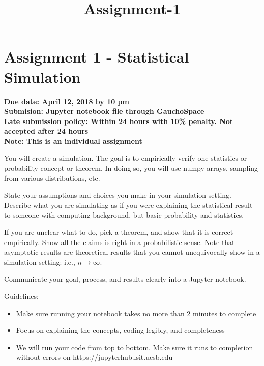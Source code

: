 \documentclass[11pt]{article}
\title{Assignment-1}
\providecommand{\tightlist}{%
      \setlength{\itemsep}{0pt}\setlength{\parskip}{0pt}}
\begin{document}
    
    
    \maketitle
    
    

    
    \hypertarget{assignment-1---statistical-simulation}{%
\section{Assignment 1 - Statistical
Simulation}\label{assignment-1---statistical-simulation}}

\textbf{Due date: April 12, 2018 by 10 pm}\\
\textbf{Submision: Jupyter notebook file through GauchoSpace}\\
\textbf{Late submission policy: Within 24 hours with 10\% penalty. Not
accepted after 24 hours}\\
\textbf{Note: This is an individual assignment}

You will create a simulation. The goal is to empirically verify one
statistics or probability concept or theorem. In doing so, you will use
numpy arrays, sampling from various distributions, etc.

State your assumptions and choices you make in your simulation setting.
Describe what you are simulating as if you were explaining the
statistical result to someone with computing background, but basic
probability and statistics.

If you are unclear what to do, pick a theorem, and show that it is
correct empirically. Show all the claims is right in a probabilistic
sense. Note that asymptotic results are theoretical results that you
cannot unequivocally show in a simulation setting: i.e.,
\(n\rightarrow\infty\).

Communicate your goal, process, and results clearly into a Jupyter
notebook.

Guidelines:

\begin{itemize}
\tightlist
\item
  Make sure running your notebook takes no more than 2 minutes to
  complete
\item
  Focus on explaining the concepts, coding legibly, and completeness
\item
  We will run your code from top to bottom. Make sure it runs to
  completion without errors on https://jupyterhub.lsit.ucsb.edu
\end{itemize}
\end{document}
